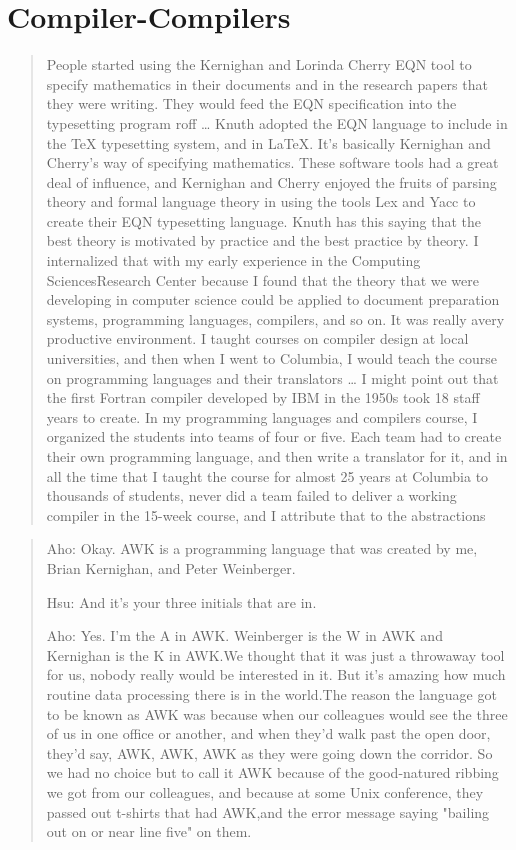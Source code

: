 \section{Compiler-Compilers}
\begin{quotation}
    People started using the Kernighan and Lorinda Cherry EQN tool to specify mathematics in their 
documents and in the research papers that they were writing. They would feed the EQN specification 
into the typesetting program roff
\dots
Knuth adopted the EQN language to include in the TeX typesetting system, and in LaTeX. It's 
basically Kernighan and Cherry's way of specifying mathematics. These software tools had a great 
deal of influence, and Kernighan and Cherry enjoyed the fruits of parsing theory and formal language 
theory in using the tools Lex and Yacc to create their EQN typesetting language. Knuth has this 
saying that the best theory is motivated by practice and the best practice by theory. I internalized 
that with my early experience in the Computing SciencesResearch Center because I found that the 
theory that we were developing in computer science could be applied to document preparation systems, 
programming languages, compilers, and so on. It was really avery productive environment. I taught 
courses on compiler design at local universities, and then when I went to Columbia, I would teach 
the course on programming languages and their translators
\dots
I might point out that the first Fortran compiler developed by IBM in the 1950s took 18 staff years 
to create. In my programming languages and compilers course, I organized the students into teams of 
four or five. Each team had to create their own programming language, and then write a translator 
for it, and in all the time that I taught the course for almost 25 years at Columbia to thousands of 
students, never did a team failed to deliver a working compiler in the 15-week course, and I 
attribute that to the abstractions
\cite{aho_oral_history_2022}
\end{quotation}
\begin{quotation}
    Aho: Okay. AWK is a programming language that was created by me, Brian 
Kernighan, and Peter Weinberger.

Hsu: And it's your three initials that are in.

Aho: Yes. I'm the A in AWK. Weinberger is the W in AWK and Kernighan is the 
K in AWK.We thought that it was just a throwaway tool for us, nobody really 
would be interested in it. But it's amazing how much routine data processing 
there is in the world.The reason the language got to be known as AWK was because 
when our colleagues would see the three of us in one office or another, and when 
they'd walk past the open door, they'd say, AWK, AWK, AWK as they were going 
down the corridor. So we had no choice but to call it AWK because of the 
good-natured ribbing we got from our colleagues, and because at some Unix 
conference, they passed out t-shirts that had AWK,and the error message saying 
"bailing out on or near line five" on them.
\end{quotation}


